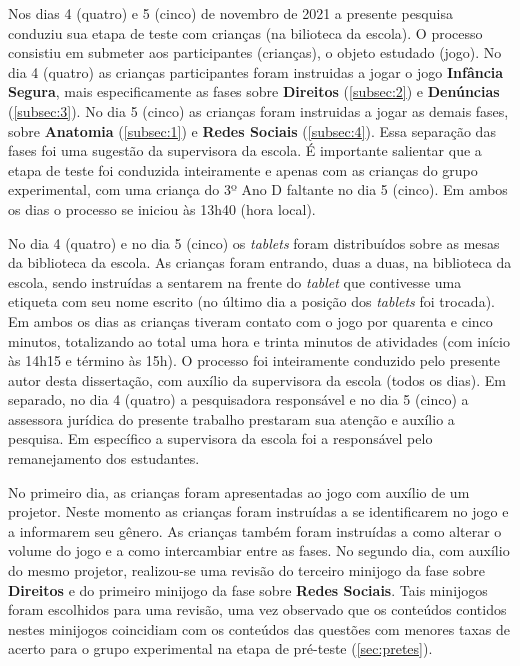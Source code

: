 Nos dias 4 (quatro) e 5 (cinco) de novembro de 2021 a presente pesquisa conduziu sua etapa de teste com crianças (na bilioteca da escola). O processo consistiu em submeter aos participantes (crianças), o objeto estudado (jogo). No dia 4 (quatro) as crianças participantes foram instruidas a jogar o jogo \textbf{Infância Segura}, mais especificamente as fases sobre \textbf{Direitos} (\autoref{subsec:2}) e \textbf{Denúncias} (\autoref{subsec:3}). No dia 5 (cinco) as crianças foram instruidas a jogar as demais fases, sobre \textbf{Anatomia} (\autoref{subsec:1}) e \textbf{Redes Sociais} (\autoref{subsec:4}). Essa separação das fases foi uma sugestão da supervisora %
da escola. É importante salientar que a etapa de teste foi conduzida inteiramente e apenas com as crianças do grupo experimental, com uma criança do 3º Ano D faltante no dia 5 (cinco). Em ambos os dias o processo se iniciou às 13h40 (hora local).

No dia 4 (quatro) e no dia 5 (cinco) os \textit{tablets} foram distribuídos sobre as mesas da biblioteca da escola. As crianças foram entrando, duas a duas, na biblioteca da escola, sendo instruídas a sentarem na frente do \textit{tablet} que contivesse uma etiqueta com seu nome escrito (no último dia a posição dos \textit{tablets} foi trocada). Em ambos os dias as crianças tiveram contato com o jogo por quarenta e cinco minutos, totalizando ao total uma hora e trinta minutos de atividades (com início às 14h15 e término às 15h). O processo foi inteiramente conduzido pelo presente autor desta dissertação, com auxílio da supervisora %
da escola (todos os dias). Em separado, no dia 4 (quatro) a pesquisadora responsável %
e no dia 5 (cinco) a %
assessora jurídica do presente trabalho prestaram sua atenção e auxílio a pesquisa. Em específico a supervisora %
da escola foi a responsável pelo remanejamento dos estudantes. %

No primeiro dia, as crianças foram apresentadas ao jogo com auxílio de um projetor. Neste momento as crianças foram instruídas a se identificarem no jogo e a informarem seu gênero. As crianças também foram instruídas a como alterar o volume do jogo e a como intercambiar entre as fases. No segundo dia, com auxílio do mesmo projetor, realizou-se uma revisão do terceiro minijogo da fase sobre \textbf{Direitos} e do primeiro minijogo da fase sobre \textbf{Redes Sociais}. Tais minijogos foram escolhidos para uma revisão, uma vez observado que os conteúdos contidos nestes minijogos coincidiam com os conteúdos das questões com menores taxas de acerto para o grupo experimental na etapa de pré-teste (\autoref{sec:pretes}).

